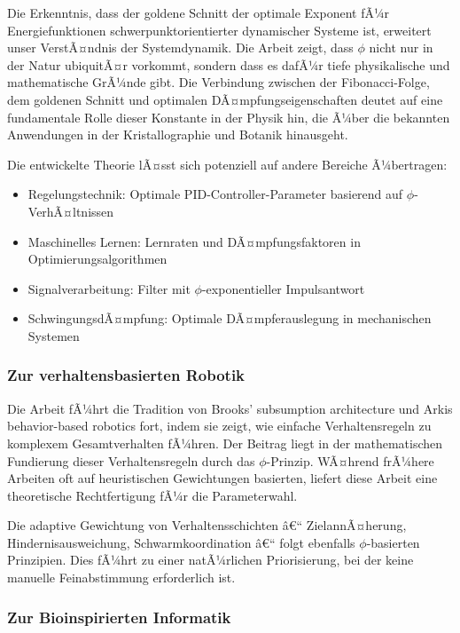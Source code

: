 ﻿\documentclass[a4paper,12pt]{article}
\theoremstyle{definition}
\begin{document}
Die Erkenntnis, dass der goldene Schnitt der optimale Exponent fÃ¼r Energiefunktionen schwerpunktorientierter dynamischer Systeme ist, erweitert unser VerstÃ¤ndnis der Systemdynamik. Die Arbeit zeigt, dass $\phi$ nicht nur in der Natur ubiquitÃ¤r vorkommt, sondern dass es dafÃ¼r tiefe physikalische und mathematische GrÃ¼nde gibt. Die Verbindung zwischen der Fibonacci-Folge, dem goldenen Schnitt und optimalen DÃ¤mpfungseigenschaften deutet auf eine fundamentale Rolle dieser Konstante in der Physik hin, die Ã¼ber die bekannten Anwendungen in der Kristallographie und Botanik hinausgeht.

Die entwickelte Theorie lÃ¤sst sich potenziell auf andere Bereiche Ã¼bertragen:
\begin{itemize}
	\item Regelungstechnik: Optimale PID-Controller-Parameter basierend auf $\phi$-VerhÃ¤ltnissen
	\item Maschinelles Lernen: Lernraten und DÃ¤mpfungsfaktoren in Optimierungsalgorithmen
	\item Signalverarbeitung: Filter mit $\phi$-exponentieller Impulsantwort
	\item SchwingungsdÃ¤mpfung: Optimale DÃ¤mpferauslegung in mechanischen Systemen
\end{itemize}

\subsubsection{Zur verhaltensbasierten Robotik}

Die Arbeit fÃ¼hrt die Tradition von Brooks' subsumption architecture und Arkis behavior-based robotics fort, indem sie zeigt, wie einfache Verhaltensregeln zu komplexem Gesamtverhalten fÃ¼hren. Der Beitrag liegt in der mathematischen Fundierung dieser Verhaltensregeln durch das $\phi$-Prinzip. WÃ¤hrend frÃ¼here Arbeiten oft auf heuristischen Gewichtungen basierten, liefert diese Arbeit eine theoretische Rechtfertigung fÃ¼r die Parameterwahl.

Die adaptive Gewichtung von Verhaltensschichten â€“ ZielannÃ¤herung, Hindernisausweichung, Schwarmkoordination â€“ folgt ebenfalls $\phi$-basierten Prinzipien. Dies fÃ¼hrt zu einer natÃ¼rlichen Priorisierung, bei der keine manuelle Feinabstimmung erforderlich ist.

\subsubsection{Zur Bioinspirierten Informatik}
\end{document}
